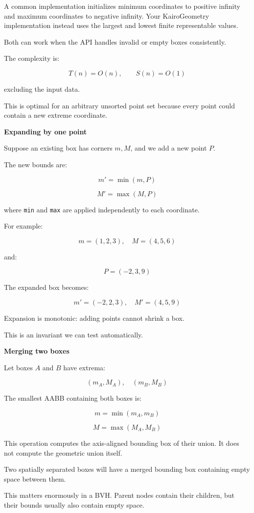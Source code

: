 A common implementation initializes minimum coordinates to positive infinity and maximum coordinates to negative infinity. Your KairoGeometry implementation instead uses the largest and lowest finite representable values.

Both can work when the API handles invalid or empty boxes consistently.

The complexity is:

\[
T(n)=O(n),\qquad S(n)=O(1)
\]

excluding the input data.

This is optimal for an arbitrary unsorted point set because every point could contain a new extreme coordinate.

\textbf{Expanding by one point}

Suppose an existing box has corners \(m,M\), and we add a new point \(P\).

The new bounds are:

\[
m'=\min(m,P)
\]

\[
M'=\max(M,P)
\]

where \texttt{min} and \texttt{max} are applied independently to each coordinate.

For example:

\[
m=(1,2,3),\quad M=(4,5,6)
\]

and:

\[
P=(-2,3,9)
\]

The expanded box becomes:

\[
m'=(-2,2,3),\quad M'=(4,5,9)
\]

Expansion is monotonic: adding points cannot shrink a box.

This is an invariant we can test automatically.

\textbf{Merging two boxes}

Let boxes \(A\) and \(B\) have extrema:

\[
(m_A,M_A),\quad(m_B,M_B)
\]

The smallest AABB containing both boxes is:

\[
\boxed{ m=\min(m_A,m_B) }
\]

\[
\boxed{ M=\max(M_A,M_B) }
\]

This operation computes the axis-aligned bounding box of their union. It does not compute the geometric union itself.

Two spatially separated boxes will have a merged bounding box containing empty space between them.

This matters enormously in a BVH. Parent nodes contain their children, but their bounds usually also contain empty space.

